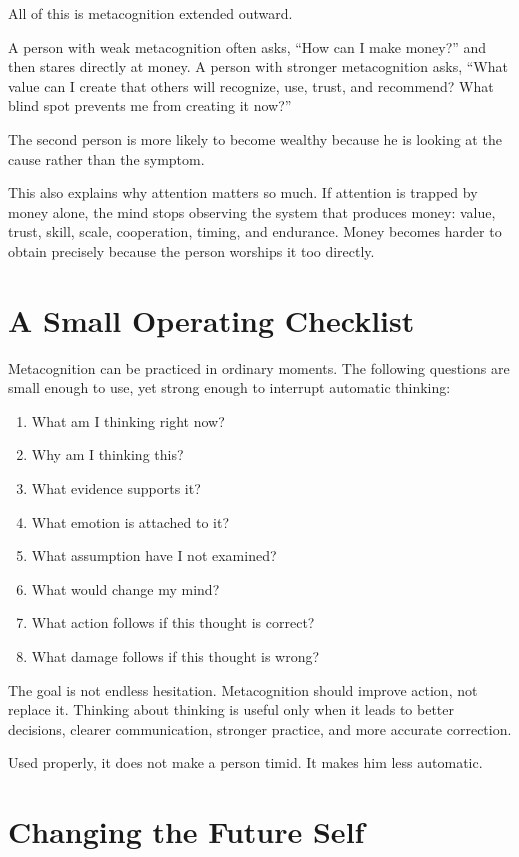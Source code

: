 All of this is metacognition extended outward.

A person with weak metacognition often asks, ``How can I make money?'' and then stares directly at money. A person with stronger metacognition asks, ``What value can I create that others will recognize, use, trust, and recommend? What blind spot prevents me from creating it now?''

The second person is more likely to become wealthy because he is looking at the cause rather than the symptom.

This also explains why attention matters so much. If attention is trapped by money alone, the mind stops observing the system that produces money: value, trust, skill, scale, cooperation, timing, and endurance. Money becomes harder to obtain precisely because the person worships it too directly.

\section*{A Small Operating Checklist}

Metacognition can be practiced in ordinary moments. The following questions are small enough to use, yet strong enough to interrupt automatic thinking:

\begin{enumerate}
\item What am I thinking right now?
\item Why am I thinking this?
\item What evidence supports it?
\item What emotion is attached to it?
\item What assumption have I not examined?
\item What would change my mind?
\item What action follows if this thought is correct?
\item What damage follows if this thought is wrong?
\end{enumerate}

The goal is not endless hesitation. Metacognition should improve action, not replace it. Thinking about thinking is useful only when it leads to better decisions, clearer communication, stronger practice, and more accurate correction.

Used properly, it does not make a person timid. It makes him less automatic.

\section*{Changing the Future Self}

